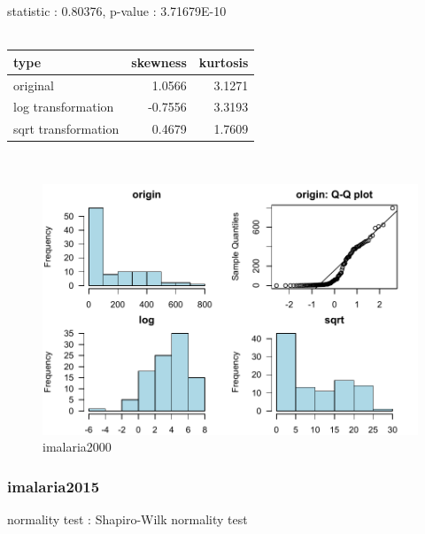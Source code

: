 \documentclass{book}\usepackage[]{graphicx}\usepackage[]{color}
\begin{document}
\noindent statistic : 0.80376,  p-value : 3.71679E-10\\
\\%
\begin{tabular}{lrr}
  \toprule
type & skewness & kurtosis \\ 
  \midrule
original & 1.0566 & 3.1271 \\ 
  log transformation & -0.7556 & 3.3193 \\ 
  sqrt transformation & 0.4679 & 1.7609 \\ 
   \bottomrule
\end{tabular}
\\
\begin{figure}[!ht]
\centering
\includegraphics[width=1.0\textwidth]{figure/norm5.pdf}
\caption{imalaria2000}
\end{figure}
\clearpage
\subsubsection{ imalaria2015 }

normality test : Shapiro-Wilk normality test
\end{document}
